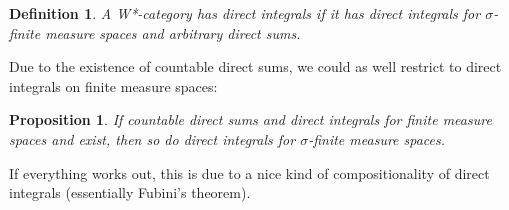\documentclass[reqno,T1]{amsproc}
\theoremstyle{plain}
\newtheorem{prop}[thm]{Proposition}
\newtheorem{defn}[thm]{Definition}
\theoremstyle{remark}
\numberwithin{equation}{section}
\begin{document}

\begin{defn}
A W*-category \emph{has direct integrals} if it has direct integrals for $\sigma$-finite measure spaces and arbitrary direct sums.
\end{defn}


Due to the existence of countable direct sums, we could as well restrict to direct integrals on finite measure spaces:

\begin{prop}
If countable direct sums and direct integrals for finite measure spaces and exist, then so do direct integrals for $\sigma$-finite measure spaces.
\end{prop}

If everything works out, this is due to a nice kind of compositionality of direct integrals (essentially Fubini's theorem).




\end{document}
